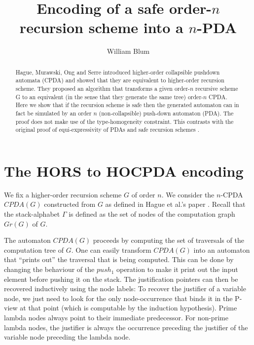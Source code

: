 \documentclass[a4paper,draft]{article}
\author{William Blum}
\title{Encoding of a safe order-$n$ recursion scheme into a $n$-PDA}
\theoremstyle{remark}
\theoremstyle{definition}
\begin{document}
\maketitle
\begin{abstract}
Hague, Murawski, Ong and Serre \cite{hmos-lics08} introduced
higher-order collapsible pushdown automata (CPDA) and showed that they are
equivalent to higher-order recursion scheme. They proposed an
algorithm that transforms a given order-$n$ recursive scheme G to
an equivalent (in the sense that they generate the same tree) order-$n$ CPDA. Here we show that if the recursion
scheme is safe then the generated automaton can in fact be simulated by an order
$n$ (non-collapsible) push-down automaton (PDA). The proof does not make
use of the type-homogeneity constraint. This contrasts with the original proof
of equi-expressivity of PDAs and safe recursion schemes \cite{KNU02}.
\end{abstract}




\section{The HORS to HOCPDA encoding}

We fix a higher-order recursion scheme $G$ of order $n$.
We consider the $n$-CPDA $CPDA(G)$ constructed from $G$ as defined in Hague et al.'s paper \cite[Definition 5.2]{hague-collaps-full}.
Recall that the stack-alphabet $\Gamma$ is defined as the set of nodes of the computation graph $Gr(G)$ of $G$.

The automaton $CPDA(G)$ proceeds by computing the set of traversals of the computation tree of $G$. One can easily transform $CPDA(G)$ into an automaton that ``prints out'' the traversal that is being computed. This can be done by changing the behaviour of the $push_1$ operation to make it print out the input element before pushing it on the stack. The justification pointers can then be recovered inductively using the node labels: To recover the justifier of a variable node, we just need to look for the only node-occurrence that binds it in the P-view at that point (which is computable by the induction hypothesis).
Prime lambda nodes always point to their immediate predecessor. For non-prime lambda nodes, the justifier is always the occurrence preceding the justifier of the variable node preceding the lambda node.
\end{document}
